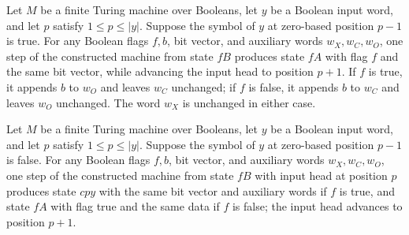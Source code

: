 \begin{theorem}
\label{Complexity.Meyer.pcfg_fB_true}
\leanok
{}
Let $M$ be a finite Turing machine over Booleans, let $y$ be a Boolean input word, and
let $p$ satisfy $1\le p\le |y|$. Suppose the symbol of $y$ at zero-based position $p-1$
is true. For any Boolean flags $f,b$, bit vector, and auxiliary words $w_X,w_C,w_O$, one
step of the constructed machine from state $fB$ produces state $fA$ with flag $f$ and
the same bit vector, while advancing the input head to position $p+1$. If $f$ is true,
it appends $b$ to $w_O$ and leaves $w_C$ unchanged; if $f$ is false, it appends $b$ to
$w_C$ and leaves $w_O$ unchanged. The word $w_X$ is unchanged in either case.
\end{theorem}

\begin{theorem}
\label{Complexity.Meyer.pcfg_fB_false}
\leanok
{}
Let $M$ be a finite Turing machine over Booleans, let $y$ be a Boolean input word, and
let $p$ satisfy $1\le p\le |y|$. Suppose the symbol of $y$ at zero-based position $p-1$
is false. For any Boolean flags $f,b$, bit vector, and auxiliary words $w_X,w_C,w_O$,
one step of the constructed machine from state $fB$ with input head at position $p$
produces state $cpy$ with the same bit vector and auxiliary words if $f$ is true, and
state $fA$ with flag true and the same data if $f$ is false; the input head advances to
position $p+1$.
\end{theorem}
